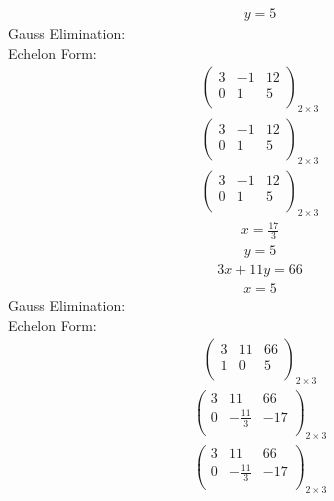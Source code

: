\documentclass{article}
\begin{document}
\begin{align*}
y=5\end{align*}
Gauss Elimination:\\
Echelon Form:\\
\begin{align*}
\left(
\begin{array}{cc|c}
3 & -1 & 12\\
0 & 1 & 5\\
\end{array}
\right)_{2\times 3}
\end{align*}
\begin{align*}
\left(
\begin{array}{cc|c}
3 & -1 & 12\\
0 & 1 & 5\\
\end{array}
\right)_{2\times 3}
\end{align*}
\begin{align*}
\left(
\begin{array}{cc|c}
3 & -1 & 12\\
0 & 1 & 5\\
\end{array}
\right)_{2\times 3}
\end{align*}
\begin{align*}
x=\frac{17}{3}\end{align*}
\begin{align*}
y=5\end{align*}
\begin{align*}
3x + 11y=66\end{align*}
\begin{align*}
x=5\end{align*}
Gauss Elimination:\\
Echelon Form:\\
\begin{align*}
\left(
\begin{array}{cc|c}
3 & 11 & 66\\
1 & 0 & 5\\
\end{array}
\right)_{2\times 3}
\end{align*}
\begin{align*}
\left(
\begin{array}{cc|c}
3 & 11 & 66\\
0 & -\frac{11}{3} & -17\\
\end{array}
\right)_{2\times 3}
\end{align*}
\begin{align*}
\left(
\begin{array}{cc|c}
3 & 11 & 66\\
0 & -\frac{11}{3} & -17\\
\end{array}
\right)_{2\times 3}
\end{align*}
\end{document}
